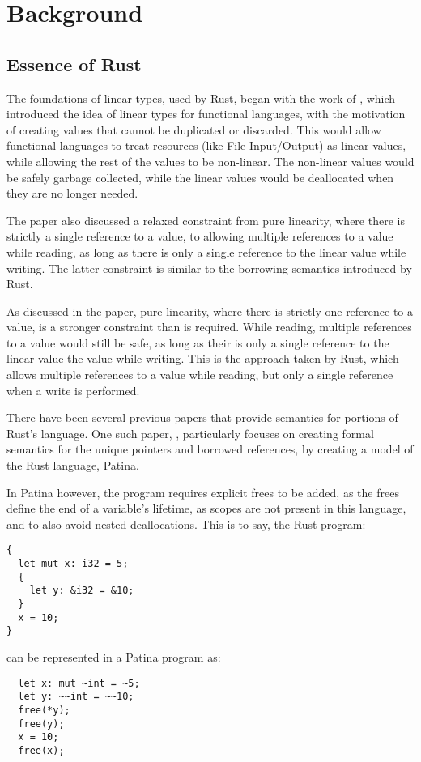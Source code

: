 \documentclass[review,twocolumn]{sigplanconf}
\begin{document}
\section{Background}


\subsection{Essence of Rust}

The foundations of linear types, used by Rust, began with the work of \citet{Wadler1990LinearTC}, which introduced the idea of linear types for functional languages, with the motivation of creating values that cannot be duplicated or discarded. This would allow functional languages to treat resources (like File Input/Output) as linear values, while allowing the rest of the values to be non-linear. The non-linear values would be safely garbage collected, while the linear values would be deallocated when they are no longer needed.

The paper also discussed a relaxed constraint from pure linearity, where there is strictly a single reference to a value, to allowing multiple references to a value while reading, as long as there is only a single reference to the linear value while writing. The latter constraint is similar to the borrowing semantics introduced by Rust.

As discussed in the paper, pure linearity, where there is strictly one reference to a value, is a stronger constraint than is required. While reading, multiple references to a value would still be safe, as long as their is only a single reference to the linear value the value while writing. This is the approach taken by Rust, which allows multiple references to a value while reading, but only a single reference when a write is performed.

There have been several previous papers that provide semantics for portions of Rust's language. One such paper, \citet{Reed2015PatinaA}, particularly focuses on creating formal semantics for the unique pointers and borrowed references, by creating a model of the Rust language, Patina.

In Patina however, the program requires explicit frees to be added, as the frees define the end of a variable's lifetime, as scopes are not present in this language, and to also avoid nested deallocations. This is to say, the Rust program:
\begin{verbatim}
{
  let mut x: i32 = 5;
  {
    let y: &i32 = &10;
  }
  x = 10;
}
\end{verbatim}
can be represented in a Patina program as:
\begin{verbatim}
  let x: mut ~int = ~5;
  let y: ~~int = ~~10;
  free(*y);
  free(y);
  x = 10;
  free(x);
\end{verbatim}
\end{document}
